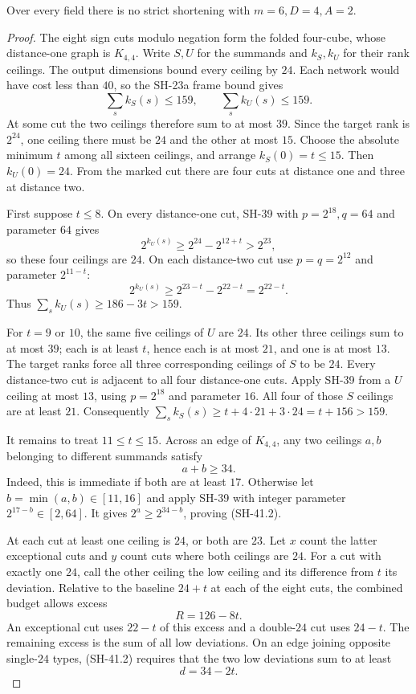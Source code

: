 \begin{theorem}
\label{thm:width-six-dimension-four}
Over every field there is no strict shortening with
$m=6,D=4,A=2$.
\end{theorem}

\begin{proof}
The eight sign cuts modulo negation form the folded
four-cube, whose distance-one graph is $K_{4,4}$.
Write $S,U$ for the summands and $k_S,k_U$ for their
rank ceilings.  The output dimensions bound every
ceiling by $24$.  Each network would have cost less
than $40$, so the SH-23a frame bound gives
\[
 \sum_s k_S(s)\le159,\qquad
 \sum_s k_U(s)\le159.                         \tag{SH-41.1}
\]
At some cut the two ceilings therefore sum to at most
$39$.  Since the target rank is $2^{24}$, one ceiling
there must be $24$ and the other at most $15$.
Choose the absolute minimum $t$ among all sixteen
ceilings, and arrange $k_S(0)=t\le15$.
Then $k_U(0)=24$.  From the marked cut there are four
cuts at distance one and three at distance two.

First suppose $t\le8$.  On every distance-one cut,
SH-39 with $p=2^{18},q=64$ and parameter $64$ gives
\[
 2^{k_U(s)}\ge2^{24}-2^{12+t}>2^{23},
\]
so these four ceilings are $24$.  On each distance-two
cut use $p=q=2^{12}$ and parameter $2^{11-t}$:
\[
 2^{k_U(s)}\ge 2^{23-t}-2^{22-t}=2^{22-t}.
\]
Thus $\sum_s k_U(s)\ge186-3t>159$.

For $t=9$ or $10$, the same five ceilings of $U$ are
$24$.  Its other three ceilings sum to at most $39$;
each is at least $t$, hence each is at most $21$, and
one is at most $13$.  The target ranks force all three
corresponding ceilings of $S$ to be $24$.
Every distance-two cut is adjacent to all four
distance-one cuts.  Apply SH-39 from a $U$ ceiling
at most $13$, using $p=2^{18}$ and parameter $16$.
All four of those $S$ ceilings are at least $21$.
Consequently $\sum_s k_S(s)\ge t+4\cdot21+3\cdot24
=t+156>159$.

It remains to treat $11\le t\le15$.  Across an edge
of $K_{4,4}$, any two ceilings $a,b$ belonging to
different summands satisfy
\[
                         a+b\ge34.          \tag{SH-41.2}
\]
Indeed, this is immediate if both are at least $17$.
Otherwise let $b=\min(a,b)\in[11,16]$ and apply
SH-39 with integer parameter $2^{17-b}\in[2,64]$.
It gives $2^a\ge2^{34-b}$, proving (SH-41.2).

At each cut at least one ceiling is $24$, or both are
$23$.  Let $x$ count the latter exceptional cuts and
$y$ count cuts where both ceilings are $24$.
For a cut with exactly one $24$, call the other ceiling
the low ceiling and its difference from $t$ its
deviation.  Relative to the baseline $24+t$ at each
of the eight cuts, the combined budget allows excess
\[
 R=126-8t.
\]
An exceptional cut uses $22-t$ of this excess and a
double-$24$ cut uses $24-t$.  The remaining excess is
the sum of all low deviations.  On an edge joining
opposite single-$24$ types, (SH-41.2) requires that
the two low deviations sum to at least
\[
 d=34-2t.                                      \tag{SH-41.3}
\]


\end{proof}
